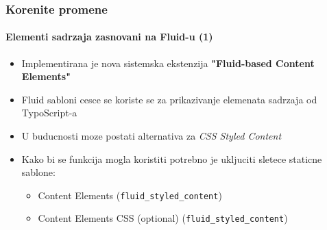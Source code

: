 \begin{frame}[fragile]
	\frametitle{Korenite promene}
	\framesubtitle{Elementi sadrzaja zasnovani na Fluid-u (1)}

	\begin{itemize}

		\item Implementirana je nova sistemska ekstenzija \textbf{"Fluid-based Content Elements"}

		\item Fluid sabloni cesce se koriste se za prikazivanje elemenata sadrzaja od TypoScript-a

		\item U buducnosti moze postati alternativa za \textit{CSS Styled Content}

		\item Kako bi se funkcija mogla koristiti potrebno je ukljuciti sletece staticne sablone:

			\begin{itemize}
				\item Content Elements (\texttt{fluid\_styled\_content})
				\item Content Elements CSS (optional) (\texttt{fluid\_styled\_content})
			\end{itemize}

	\end{itemize}

\end{frame}




